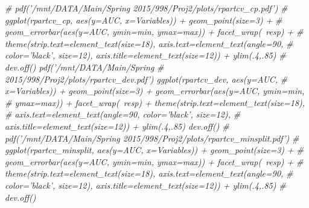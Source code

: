 \documentclass[11pt,]{article}
\newenvironment{Shaded}{\begin{snugshade}}{\end{snugshade}}
\newcommand{\CommentTok}[1]{\textcolor[rgb]{0.56,0.35,0.01}{\textit{{#1}}}}
\begin{document}
\begin{Shaded}
\begin{Highlighting}[]
{\CommentTok{# pdf('/mnt/DATA/Main/Spring 2015/998/Proj2/plots/rpartcv_cp.pdf')}
\CommentTok{# ggplot(rpartcv_cp, aes(y=AUC, x=Variables)) + geom_point(size=3) +}
\CommentTok{# geom_errorbar(aes(y=AUC, ymin=min, ymax=max)) + facet_wrap(~resp) +}
\CommentTok{# theme(strip.text=element_text(size=18), axis.text=element_text(angle=90,}
\CommentTok{# color='black', size=12), axis.title=element_text(size=12)) + ylim(.4,.85)}
\CommentTok{# dev.off() pdf('/mnt/DATA/Main/Spring}
\CommentTok{# 2015/998/Proj2/plots/rpartcv_dev.pdf') ggplot(rpartcv_dev, aes(y=AUC,}
\CommentTok{# x=Variables)) + geom_point(size=3) + geom_errorbar(aes(y=AUC, ymin=min,}
\CommentTok{# ymax=max)) + facet_wrap(~resp) + theme(strip.text=element_text(size=18),}
\CommentTok{# axis.text=element_text(angle=90, color='black', size=12),}
\CommentTok{# axis.title=element_text(size=12)) + ylim(.4,.85) dev.off()}
\CommentTok{# pdf('/mnt/DATA/Main/Spring 2015/998/Proj2/plots/rpartcv_minsplit.pdf')}
\CommentTok{# ggplot(rpartcv_minsplit, aes(y=AUC, x=Variables)) + geom_point(size=3) +}
\CommentTok{# geom_errorbar(aes(y=AUC, ymin=min, ymax=max)) + facet_wrap(~resp) +}
\CommentTok{# theme(strip.text=element_text(size=18), axis.text=element_text(angle=90,}
\CommentTok{# color='black', size=12), axis.title=element_text(size=12)) + ylim(.4,.85)}
\CommentTok{# dev.off()}

}
\end{Highlighting}
\end{Shaded}
\end{document}
